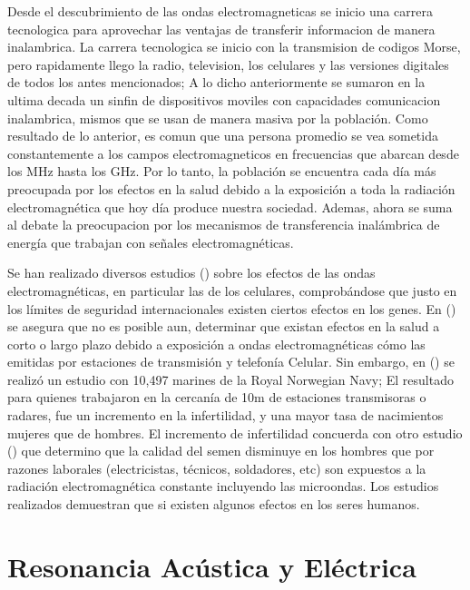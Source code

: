 \documentclass{intech}
\begin{document}
Desde el descubrimiento de las ondas electromagneticas se inicio una carrera tecnologica para aprovechar las ventajas de transferir informacion de manera inalambrica. La carrera tecnologica se inicio con la transmision de  codigos Morse, pero rapidamente llego la radio, television, los celulares y las versiones digitales de todos los antes mencionados; A lo dicho anteriormente se sumaron en la ultima decada
un sinfin de dispositivos moviles con capacidades comunicacion inalambrica, mismos que se usan de manera masiva por la población. Como resultado de lo anterior, es comun que
una persona promedio se vea sometida constantemente a los campos electromagneticos en frecuencias que abarcan desde los MHz hasta los GHz. Por lo tanto, la poblaci\'on se encuentra cada d{\'i}a m\'as preocupada por los efectos en la salud debido a la exposici\'on a toda la radiaci\'on electromagn\'etica que hoy d{\'i}a produce nuestra sociedad. Ademas, ahora se suma al debate la preocupacion
por los mecanismos de transferencia inal\'ambrica de energ{\'i}a que trabajan con se\~nales electromagn\'eticas.

Se han realizado diversos estudios (\cite{RES15,RES16})  sobre los efectos de las ondas electromagn\'eticas, en particular las de los celulares, comprob\'andose que justo en los l{\'i}mites de seguridad internacionales existen ciertos efectos en los genes. En (\cite{RES13}) se asegura que no es posible aun, determinar que existan efectos en la salud a corto o largo plazo  debido a exposici\'on a ondas electromagn\'eticas c\'omo las emitidas por estaciones de transmisi\'on y telefon{\'i}a Celular. Sin embargo, en (\cite{RES14}) se realiz\'o un estudio con 10,497 marines de la Royal Norwegian Navy; El resultado para quienes trabajaron en la cercan{\'i}a de 10m de estaciones transmisoras o radares, fue un incremento en la infertilidad, y una mayor tasa de nacimientos mujeres que de hombres.
El incremento de infertilidad concuerda con otro estudio (\cite{RES14x}) que determino que la calidad del semen disminuye en los hombres que por razones laborales (electricistas, t\'ecnicos, soldadores, etc) son expuestos a la radiaci\'on electromagn\'etica constante incluyendo las microondas.  Los estudios realizados demuestran que si existen algunos efectos  en los seres humanos.

\section{Resonancia Ac\'ustica y El\'ectrica}
\end{document}
